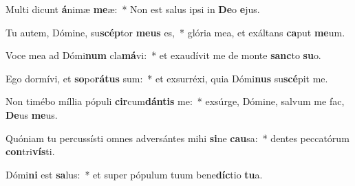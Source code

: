 \item Multi dicunt \textbf{á}nimæ \textbf{me}æ:~* Non est salus ipsi in \textbf{De}o \textbf{e}jus.
\item Tu autem, Dómine, su\textbf{scép}tor \textbf{me}\textbf{us} es,~* glória mea, et exáltans \textbf{ca}put \textbf{me}um.
\item Voce mea ad Dómi\textbf{num} cla\textbf{má}vi:~* et exaudívit me de monte \textbf{sanc}to \textbf{su}o.
\item Ego dormívi, et \textbf{so}po\textbf{rá}\textbf{tus} sum:~* et exsurréxi, quia Dómi\textbf{nus} su\textbf{scé}pit me.
\item Non timébo míllia pópuli \textbf{cir}cum\textbf{dán}\textbf{tis} me:~* exsúrge, Dómine, salvum me fac, \textbf{De}us \textbf{me}us.
\item Quóniam tu percussísti omnes adversántes mihi \textbf{si}ne \textbf{cau}sa:~* dentes peccatórum \textbf{con}tri\textbf{vís}ti.
\item Dómi\textbf{ni} est \textbf{sa}lus:~* et super pópulum tuum bene\textbf{díc}tio \textbf{tu}a.
